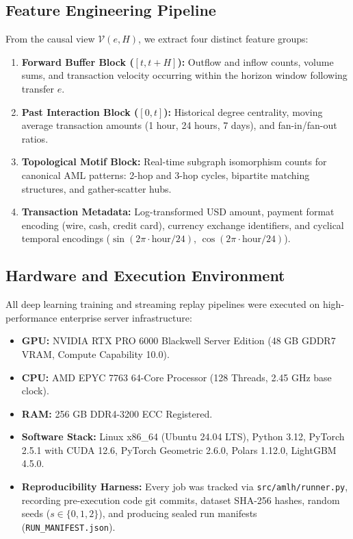 \documentclass[11pt,a4paper]{article}
\begin{document}
\subsection{Feature Engineering Pipeline}
From the causal view $\mathcal{V}(e, H)$, we extract four distinct feature groups:
\begin{enumerate}[leftmargin=*]
    \item \textbf{Forward Buffer Block ($[t, t+H]$):} Outflow and inflow counts, volume sums, and transaction velocity occurring within the horizon window following transfer $e$.
    \item \textbf{Past Interaction Block ($[0, t]$):} Historical degree centrality, moving average transaction amounts (1 hour, 24 hours, 7 days), and fan-in/fan-out ratios.
    \item \textbf{Topological Motif Block:} Real-time subgraph isomorphism counts for canonical AML patterns: 2-hop and 3-hop cycles, bipartite matching structures, and gather-scatter hubs.
    \item \textbf{Transaction Metadata:} Log-transformed USD amount, payment format encoding (wire, cash, credit card), currency exchange identifiers, and cyclical temporal encodings ($\sin(2\pi \cdot \text{hour} / 24)$, $\cos(2\pi \cdot \text{hour} / 24)$).
\end{enumerate}

\subsection{Hardware and Execution Environment}
All deep learning training and streaming replay pipelines were executed on high-performance enterprise server infrastructure:
\begin{itemize}[leftmargin=*]
    \item \textbf{GPU:} NVIDIA RTX PRO 6000 Blackwell Server Edition (48 GB GDDR7 VRAM, Compute Capability 10.0).
    \item \textbf{CPU:} AMD EPYC 7763 64-Core Processor (128 Threads, 2.45 GHz base clock).
    \item \textbf{RAM:} 256 GB DDR4-3200 ECC Registered.
    \item \textbf{Software Stack:} Linux x86\_64 (Ubuntu 24.04 LTS), Python 3.12, PyTorch 2.5.1 with CUDA 12.6, PyTorch Geometric 2.6.0, Polars 1.12.0, LightGBM 4.5.0.
    \item \textbf{Reproducibility Harness:} Every job was tracked via \texttt{src/amlh/runner.py}, recording pre-execution code git commits, dataset SHA-256 hashes, random seeds ($s \in \{0, 1, 2\}$), and producing sealed run manifests (\texttt{RUN\_MANIFEST.json}).
\end{itemize}
\end{document}
